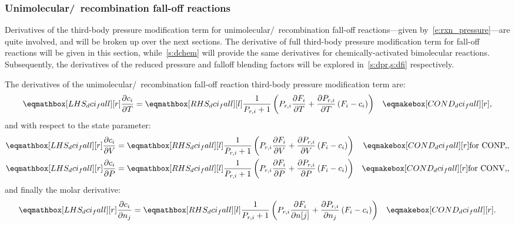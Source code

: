 \documentclass[12pt,number,sort&compress]{elsarticle}
\begin{document}
\subsubsection{Unimolecular\slash~recombination fall-off reactions}
\label{s:dfall}
Derivatives of the third-body pressure modification term for unimolecular\slash~recombination fall-off reactions---given by~\cref{e:rxn_pressure}---are quite involved, and will be broken up over the next sections.
The derivative of full third-body pressure modification term for fall-off reactions will be given in this section, while~\cref{s:dchem} will provide the same derivatives for chemically-activated bimolecular reactions.
Subsequently, the derivatives of the reduced pressure and falloff blending factors will be explored in~\cref{s:dpr,s:dfi} respectively.

The derivatives of the unimolecular\slash~recombination fall-off reaction third-body pressure modification term are:
\begin{align}
 \label{e:dci_fall_dt}
 \lhs{dci_fall}{\frac{\partial c_{i} }{\partial T }} &= \rhs{dci_fall}{\frac{1}{P_{r, i} + 1} \left(P_{r, i} \frac{\partial F_{i} }{\partial T } + \frac{\partial P_{r, i} }{\partial T } \left(F_{i} - c_{i}\right)\right)} & \cond{dci_fall}{,}
\end{align}
and with respect to the state parameter:
\begin{subequations}
 \label{e:dci_fall_de}
 \begin{align}
  \lhs{dci_fall}{\frac{\partial c_i }{\partial V }} &= \rhs{dci_fall}{\frac{1}{P_{r, i} + 1} \left(P_{r, i} \frac{\partial F_{i} }{\partial V } + \frac{\partial P_{r, i} }{\partial V } \left(F_{i} - c_{i}\right)\right)} & \cond{dci_fall}{\dconp/,} \\
  \lhs{dci_fall}{\frac{\partial c_i }{\partial P }} &= \rhs{dci_fall}{\frac{1}{P_{r, i} + 1} \left(P_{r, i} \frac{\partial F_{i} }{\partial P } + \frac{\partial P_{r, i} }{\partial P } \left(F_{i} - c_{i}\right)\right)} & \cond{dci_fall}{\dconv/,}
 \end{align}
\end{subequations}
and finally the molar derivative:
\begin{align}
 \label{e:dci_fall_dnj}
 \lhs{dci_fall}{\frac{\partial c_{i} }{\partial n_j}} &= \rhs{dci_fall}{\frac{1}{P_{r, i} + 1} \left(P_{r, i} \frac{\partial F_{i} }{\partial n[j] } + \frac{\partial P_{r, i} }{\partial n_j } \left(F_{i} - c_{i}\right)\right)} & \cond{dci_fall}{.}
\end{align}
\end{document}
